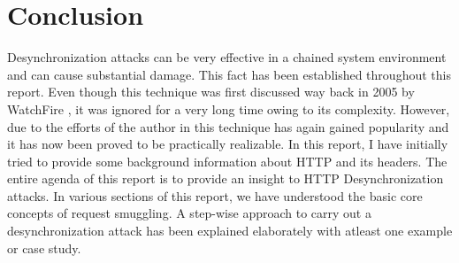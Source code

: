 \chapter{Conclusion}
Desynchronization attacks can be very effective in a chained system environment and can cause substantial damage. This fact has been established throughout this report. Even though this technique was first discussed way back in 2005 by WatchFire \cite{b5}, it was ignored for a very long time owing to its complexity. However, due to the efforts of the author in \cite{b6} this technique has again gained popularity and it has now been proved to be practically realizable. In this report, I have initially tried to provide some background information about HTTP and its headers. The entire agenda of this report is to provide an insight to HTTP Desynchronization attacks. In various sections of this report, we have understood the basic core concepts of request smuggling. A step-wise approach to carry out a desynchronization attack has been explained elaborately with atleast one example or case study. 